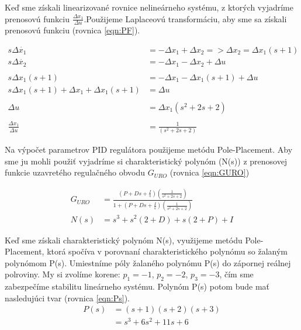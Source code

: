 \documentclass[../main.tex]{subfiles}
\begin{document}
Keď sme získali linearizované rovnice nelineárneho systému, z ktorých vyjadríme prenosovú funkciu $\frac{\Delta x_1}{\Delta u}$.Použijeme Laplaceovú transformáciu, aby sme sa získali prenosovú funkciu (rovnica \ref{eqn:PF}).

\begin{equation}
\begin{split} 
s\Delta \dot{x_1}  &= -\Delta x_1 + \Delta x_2 => \Delta x_2 = \Delta x_1(s+1) \\
s\Delta \dot{x_2} & = -\Delta x_1 - \Delta x_2 + \Delta u \\\\
s\Delta x_1(s+1) & = -\Delta x_1 - \Delta x_1(s+1) + \Delta u\\
s\Delta x_1(s+1) + \Delta x_1 + \Delta x_1(s+1) & = \Delta u\\\\
\Delta u & = \Delta x_1(s^2+2s+2)\\\\
\frac{\Delta x_1}{\Delta u} & = \frac{1}{(s^2+2s+2)}\
 \end{split}
 \label{eqn:PF}
\end{equation}	

Na výpočet parametrov PID regulátora použijeme metódu Pole-Placement. Aby sme ju mohli použiť vyjadríme si charakteristický polynóm (N(s)) z prenosovej funkcie uzavretého regulačného obvodu ${G_{URO}}$ (rovnica \ref{eqn:GURO})

\begin{equation}
	\begin{aligned}
	G_{URO} &= \frac{(P+Ds+\frac{I}{s})(\frac{1}{s^2+2s+2})}{1+(P+Ds+\frac{I}{s})(\frac{1}{s^2+2s+2})}  \\
		N(s)	&= s^3+s^2(2+D)+s(2+P)+I
	\end{aligned}
	\label{eqn:GURO}
\end{equation}

Keď sme získali charakteristický polynóm N(s), využijeme  metódu Pole-Placement, ktorá spočíva v porovnaní charakteristického polynómu so žalaným polynómom P(s). Umiestníme póly žalaného polynómu P(s) do zápornej reálnej polroviny. My si zvolíme korene: $p_1 = -1$, $p_2 = -2$, $p_3 = -3$, čím sme zabezpečíme stabilitu lineárneho systému. Polynóm P(s) potom bude mať nasledujúci tvar (rovnica \ref{eqn:Ps}). 
\begin{equation}
	\begin{aligned}
	P(s) &= (s + 1)(s + 2)(s + 3) \\
		 &= s^3 + 6s^2 + 11s + 6 \\
	\end{aligned}
\label{eqn:Ps}
\end{equation}
\end{document}
